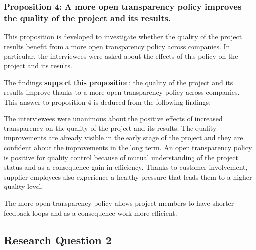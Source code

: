 \vspace{.2cm}
\subsubsection{Proposition 4: A more open transparency policy improves the quality of the project and its results.}

%
%
%

This proposition is developed to investigate whether the quality of the project results benefit from a more open transparency policy across companies. In particular, the interviewees were asked about the effects of this policy on the project and its results.

The findings {\bf support this proposition}:  the quality of the project and its results improve thanks to a more open transparency policy across companies. This answer to proposition 4 is deduced from the following findings:

 The interviewees were unanimous about the positive effects of increased transparency on the quality of the project and its results. The quality improvements are already visible in the early stage of the project and they are confident about the improvements in the long term. An open transparency policy is positive for quality control because of mutual understanding of the project status and as a consequence gain in efficiency. Thanks to customer involvement, supplier employees also experience a healthy pressure that leads them to a higher quality level.

 The more open transparency policy allows project members to have shorter feedback loops and as a consequence work more efficient.

\subsection{Research Question 2}\label{sec:ResearchQuestion2}

